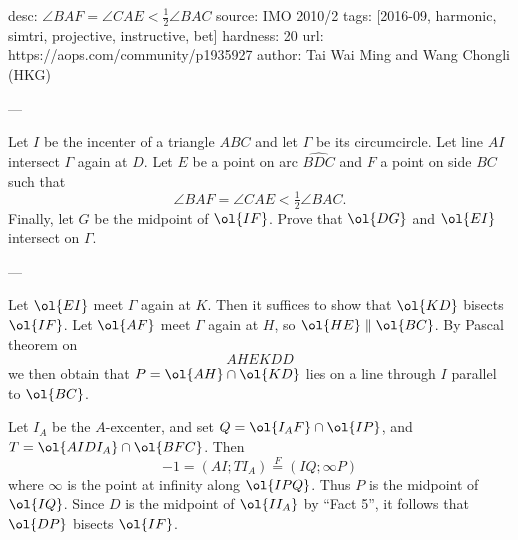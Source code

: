 desc: $\angle BAF = \angle CAE < \frac12\angle BAC$
source: IMO 2010/2
tags: [2016-09, harmonic, simtri, projective, instructive, bet]
hardness: 20
url: https://aops.com/community/p1935927
author: Tai Wai Ming and Wang Chongli (HKG)

---

Let $I$ be the incenter of a triangle $ABC$ and let $\Gamma$ be its circumcircle.
Let line $AI$ intersect $\Gamma$ again at $D$.
Let $E$ be a point on arc $\widehat{BDC}$ and $F$ a point on side $BC$ such that
\[ \angle BAF = \angle CAE < \tfrac12 \angle BAC. \]
Finally, let $G$ be the midpoint of $\ol{IF}$.
Prove that $\ol{DG}$ and $\ol{EI}$ intersect on $\Gamma$.

---

Let $\ol{EI}$ meet $\Gamma$ again at $K$.
Then it suffices to show that $\ol{KD}$ bisects $\ol{IF}$.
Let $\ol{AF}$ meet $\Gamma$ again at $H$, so $\ol{HE} \parallel \ol{BC}$.
By Pascal theorem on \[ AHEKDD \]
we then obtain that $P = \ol{AH} \cap \ol{KD}$ lies on a line through $I$
parallel to $\ol{BC}$.

Let $I_A$ be the $A$-excenter,
and set $Q = \ol{I_AF} \cap \ol{IP}$, and $T = \ol{AIDI_A} \cap \ol{BFC}$.
Then
\[ -1 = (AI;TI_A) \overset{F} = (IQ;\infty P) \]
where $\infty$ is the point at infinity along $\ol{IPQ}$.
Thus $P$ is the midpoint of $\ol{IQ}$.
Since $D$ is the midpoint of $\ol{II_A}$ by ``Fact 5'',
it follows that $\ol{DP}$ bisects $\ol{IF}$.

